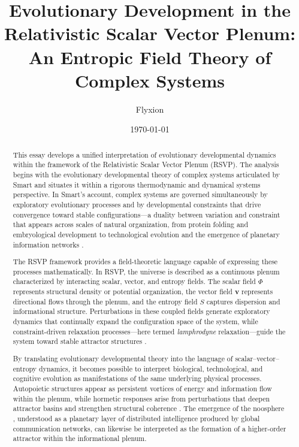 \documentclass[12pt]{article}
\title{Evolutionary Development in the Relativistic Scalar Vector Plenum:\\
An Entropic Field Theory of Complex Systems}
\author{Flyxion}
\date{\today}
\begin{document}
\maketitle

\begin{abstract}
This essay develops a unified interpretation of evolutionary developmental dynamics within the framework of the Relativistic Scalar Vector Plenum (RSVP). The analysis begins with the evolutionary developmental theory of complex systems articulated by Smart \cite{smart2009,smart2023} and situates it within a rigorous thermodynamic and dynamical systems perspective. In Smart's account, complex systems are governed simultaneously by exploratory evolutionary processes and by developmental constraints that drive convergence toward stable configurations---a duality between variation and constraint that appears across scales of natural organization, from protein folding and embryological development \cite{kauffman1993,goodwin1994} to technological evolution and the emergence of planetary information networks \cite{barabasi2016,mitchell2009}.

The RSVP framework provides a field-theoretic language capable of expressing these processes mathematically. In RSVP, the universe is described as a continuous plenum characterized by interacting scalar, vector, and entropy fields. The scalar field $\Phi$ represents structural density or potential organization, the vector field $\mathbf{v}$ represents directional flows through the plenum, and the entropy field $S$ captures dispersion and informational structure. Perturbations in these coupled fields generate exploratory dynamics that continually expand the configuration space of the system, while constraint-driven relaxation processes---here termed \emph{lamphrodyne} relaxation---guide the system toward stable attractor structures \cite{strogatz1994,nicolis1977}.

By translating evolutionary developmental theory into the language of scalar--vector--entropy dynamics, it becomes possible to interpret biological, technological, and cognitive evolution as manifestations of the same underlying physical processes. Autopoietic structures \cite{maturana1980} appear as persistent vortices of energy and information flow within the plenum, while hormetic responses arise from perturbations that deepen attractor basins and strengthen structural coherence \cite{bak1996}. The emergence of the noosphere \cite{dechardin1955,smart2023}, understood as a planetary layer of distributed intelligence produced by global communication networks, can likewise be interpreted as the formation of a higher-order attractor within the informational plenum.


\end{abstract}
\end{document}
